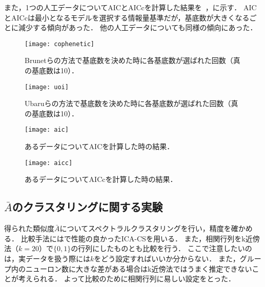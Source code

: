 また，1つの人工データについてAICとAICcを計算した結果を~，に示す．
AICとAICcは最小となるモデルを選択する情報量基準だが，基底数が大きくなるごとに減少する傾向があった．
他の人工データについても同様の傾向にあった．

\begin{figure}[htbp]
    \begin{minipage}{0.5\hsize}
        \begin{center}
            \texttt{[image: cophenetic]}
						\caption{Brunetらの方法で基底数を決めた時に各基底数が選ばれた回数（真の基底数は10）．}
            \label{fig:cophenetic}
        \end{center}
    \end{minipage}
    \begin{minipage}{0.5\hsize}
        \begin{center}
            \texttt{[image: uoi]}
						\caption{Ubaruらの方法で基底数を決めた時に各基底数が選ばれた回数（真の基底数は10）．}
            \label{fig:uoi}
        \end{center}
    \end{minipage}
\end{figure}
\begin{figure}[htbp]
    \begin{minipage}{0.5\hsize}
        \begin{center}
            \texttt{[image: aic]}
						\caption{あるデータについてAICを計算した時の結果．}
            \label{fig:aic}
        \end{center}
    \end{minipage}
    \begin{minipage}{0.5\hsize}
        \begin{center}
						\texttt{[image: aicc]}
						\caption{あるデータについてAICc\cite{Symonds2011}を計算した時の結果．}
            \label{fig:aicc}
        \end{center}
    \end{minipage}
\end{figure}

\subsection{$\bar{A}$のクラスタリングに関する実験}
得られた類似度$\bar{A}$についてスペクトラルクラスタリングを行い，精度を確かめる．
比較手法には\cite{Molter2018}で性能の良かったICA-CSを用いる．
また，相関行列をk近傍法（$k=20$）で$\{0,1\}$の行列にしたものとも比較を行う．
ここで注意したいのは，実データを扱う際には$k$をどう設定すればいいか分からない．
また，グループ内のニューロン数に大きな差がある場合はk近傍法ではうまく推定できないことが考えられる．
よって比較のために相関行列に易しい設定をとった．

